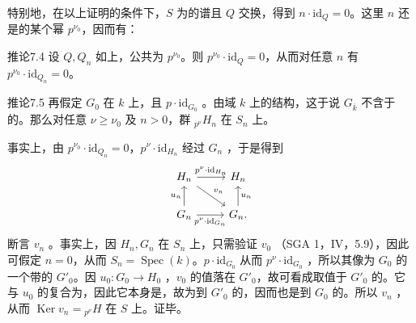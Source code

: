 特别地，在以上证明的条件下，$S$ 为的谱且 $Q$ 交换，得到 $n\cdot\mathrm{id}_Q=0$。这里 $n$ 还是的某个幂 $p^{\nu_0}$，因而有：
\begin{SGAresult}{推论}{7.4}
设 $Q,Q_n$ 如上，公共为 $p^{\nu_0}$。则 $p^{\nu_0}\cdot\mathrm{id}_Q=0$，从而对任意 $n$ 有 $p^{\nu_0}\cdot\mathrm{id}_{Q_n}=0$。
\end{SGAresult}
\begin{SGAresult}{推论}{7.5}
再假定 $G_0$ 在 $k$ 上，且 $p\cdot\mathrm{id}_{G_0}$ 。由域 $k$ 上的结构，这于说 $G_{\overline k}$ 不含于的。那么对任意 $\nu\geq\nu_0$ 及 $n>0$，群 ${}_{p^\nu}H_n$ 在 $S_n$ 上。
\end{SGAresult}
事实上，由 $p^{\nu_0}\cdot\mathrm{id}_{Q_n}=0$，$p^\nu\cdot\mathrm{id}_{H_n}$ 经过 $G_n$ ，于是得到
\[
\begin{tikzcd}
H_n\arrow[r,"p^\nu\cdot\mathrm{id}_{H_n}"]\arrow[dr,"v_n"]&H_n\\
G_n\arrow[u,"u_n"]\arrow[r,"p^\nu\cdot\mathrm{id}_{G_n}"']&G_n\arrow[u,"u_n"'].
\end{tikzcd}
\]
断言 $v_n$ 。事实上，因 $H_n,G_n$ 在 $S_n$ 上，只需验证 $v_0$ （SGA 1，IV，5.9），因此可假定 $n=0$，从而 $S_n=\operatorname{Spec}(k)$。$p\cdot\mathrm{id}_{G_0}$ 从而 $p^\nu\cdot\mathrm{id}_{G_0}$ ，所以其像为 $G_0$ 的一个带的 $G'_0$。因 $u_0:G_0\to H_0$ ，$v_0$ 的值落在 $G'_0$，故可看成取值于 $G'_0$ 的。它与 $u_0$ 的复合为，因此它本身是，故为到 $G'_0$ 的，因而也是到 $G_0$ 的。所以 $v_n$ ，从而 $\operatorname{Ker}v_n={}_{p^\nu}H$ 在 $S$ 上。证毕。

